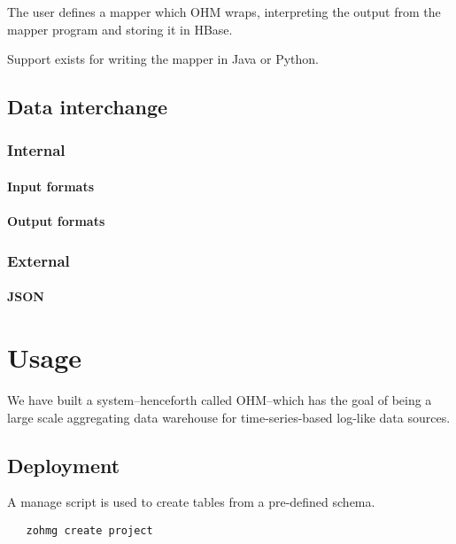\documentclass[a4paper,10pt]{book}
\begin{document}
The user defines a mapper which OHM wraps, interpreting the output from the
mapper program and storing it in HBase.

Support exists for writing the mapper in Java or Python.



\section{Data interchange}

\subsection{Internal}

\subsubsection{Input formats}

\subsubsection{Output formats}

\subsection{External}

\subsubsection{JSON}


\chapter{Usage}

We have built a system--henceforth called OHM--which has the goal of being
a large scale aggregating data warehouse for time-series-based log-like
data sources.



\section{Deployment}

A manage script is used to create tables from a pre-defined schema.

\begin{verbatim}
   zohmg create project
\end{verbatim}
\end{document}
